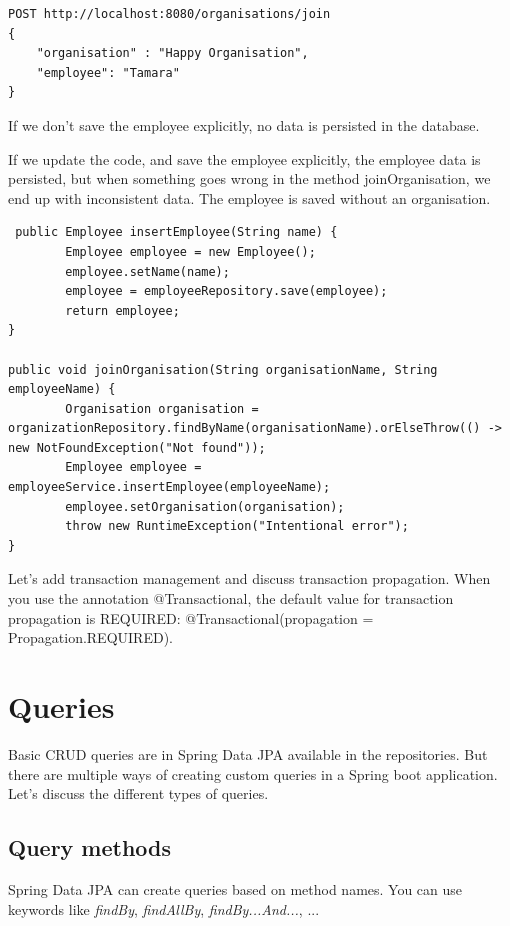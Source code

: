 \begin{verbatim}
POST http://localhost:8080/organisations/join
{
	"organisation" : "Happy Organisation",
	"employee": "Tamara"
}
\end{verbatim}

If we don't save the employee explicitly, no data is persisted in the database.

If we update the code, and save the employee explicitly, the employee data is persisted, but when something goes wrong in the method joinOrganisation, we end up with inconsistent data. The employee is saved without an organisation.

\begin{lstlisting}
 public Employee insertEmployee(String name) {
        Employee employee = new Employee();
        employee.setName(name);
        employee = employeeRepository.save(employee);
        return employee;
}

public void joinOrganisation(String organisationName, String employeeName) {
        Organisation organisation = organizationRepository.findByName(organisationName).orElseThrow(() -> new NotFoundException("Not found"));
        Employee employee = employeeService.insertEmployee(employeeName);
        employee.setOrganisation(organisation);
        throw new RuntimeException("Intentional error");
}
\end{lstlisting}

Let's add transaction management and discuss transaction propagation.
When you use the annotation @Transactional, the default value for transaction propagation is REQUIRED: @Transactional(propagation = Propagation.REQUIRED).





\section{Queries}

Basic CRUD queries are in Spring Data JPA available in the repositories. But there are multiple ways of creating custom queries in a Spring boot application. Let's discuss the different types of queries.

\subsection{Query methods}

Spring Data JPA can create queries based on method names. You can use keywords like \textit{findBy}, \textit{findAllBy},
\textit{findBy...And...}, ...

